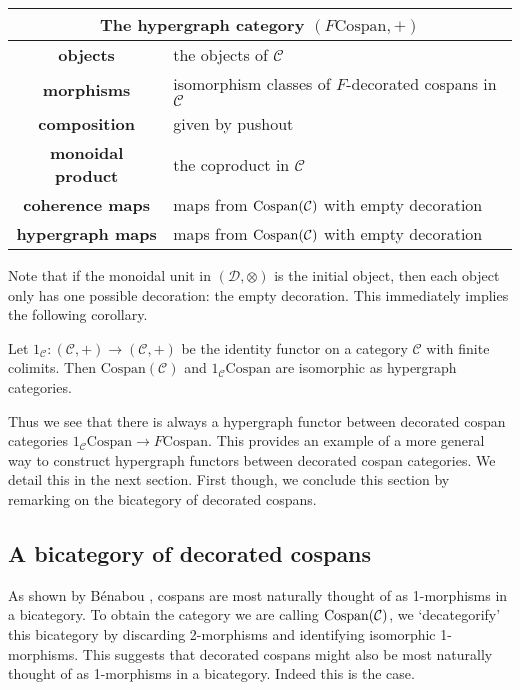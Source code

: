 \begin{center}
  \begin{tabular}{| c | p{} |}
    \hline
    \multicolumn{2}{|c|}{The hypergraph category $(F\mathrm{Cospan},+)$} \\
    \hline
    \textbf{objects} & the objects of $\mathcal C$ \\ 
    \textbf{morphisms} & isomorphism classes of $F$-decorated cospans in
    $\mathcal C$\\ 
    \textbf{composition} & given by pushout \\
    \textbf{monoidal product} & the coproduct in $\mathcal C$ \\
    \textbf{coherence maps} &  maps from $\operatorname{{Cospan}}(\mathcal C)$ with empty decoration \\
    \textbf{hypergraph maps} & maps from $\operatorname{{Cospan}}(\mathcal C)$ with empty decoration
    \\
    \hline
  \end{tabular}
\end{center}
\smallskip

Note that if the monoidal unit in $(\mathcal D,\otimes)$ is the initial object,
then each object only has one possible decoration: the empty decoration. This
immediately implies the following corollary.
\begin{corollary}
  Let $1_{\mathcal C}\colon (\mathcal C,+) \to (\mathcal C,+)$ be the identity functor
  on a category $\mathcal C$ with finite colimits. Then
  $\mathrm{Cospan}(\mathcal C)$ and $1_{\mathcal C}\mathrm{Cospan}$ are
  isomorphic as hypergraph categories.
\end{corollary}

Thus we see that there is always a hypergraph functor between decorated cospan
categories $1_{\mathcal C}\mathrm{Cospan} \rightarrow F\mathrm{Cospan}$. This
provides an example of a more general way to construct hypergraph functors
between decorated cospan categories. We detail this in the next section. First
though, we conclude this section by remarking on the bicategory of decorated
cospans.

\subsection{A bicategory of decorated cospans} \label{ssec.bicatdeccospan}
As shown by B\'enabou \cite{Ben67}, cospans are most naturally thought of as
1-morphisms in a bicategory.  To obtain the category we are calling
$\mathrm{Cospan}(\mathcal C)$, we `decategorify' this bicategory by discarding
2-morphisms and identifying isomorphic 1-morphisms. This suggests that decorated
cospans might also be most naturally thought of as 1-morphisms in a bicategory.
Indeed this is the case.  

